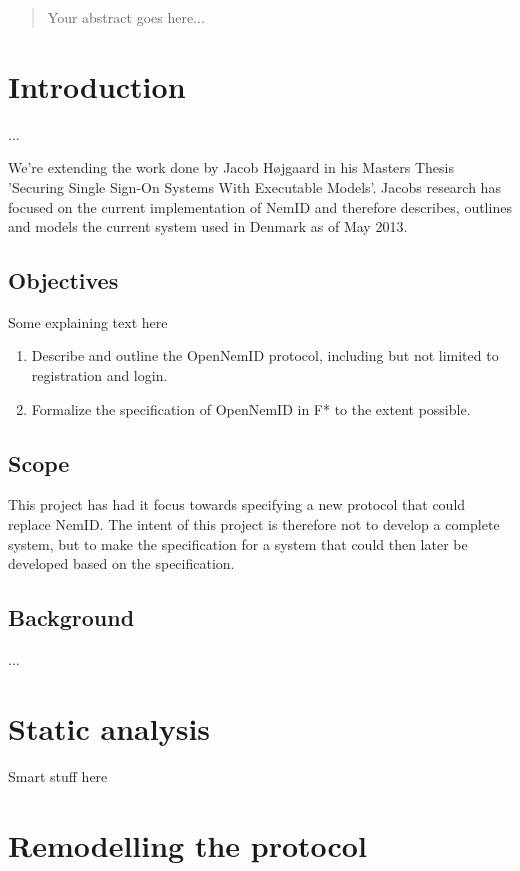 \documentclass[twosided]{report}
\begin{document}
\begin{abstract}
Your abstract goes here...
\end{abstract}

\tableofcontents

\chapter{Introduction}

$\ldots$
\par
We're extending the work done by Jacob Højgaard in his Masters Thesis 'Securing Single Sign-On Systems With Executable Models'. Jacobs research has focused on the current implementation of NemID and therefore describes, outlines and models the current system used in Denmark as of May 2013.

\section{Objectives}
Some explaining text here
\par

\begin{enumerate}
	\item Describe and outline the OpenNemID protocol, including but not limited to registration and login.
	\item Formalize the specification of OpenNemID in F* to the extent possible.
\end{enumerate}

\section{Scope}
This project has had it focus towards specifying a new protocol that could replace NemID. The intent of this project is therefore not to develop a complete system, but to make the specification for a system that could then later be developed based on the specification.

\section{Background}
$\ldots$
 
\chapter{Static analysis}
Smart stuff here


\chapter{Remodelling the protocol}
\end{document}
